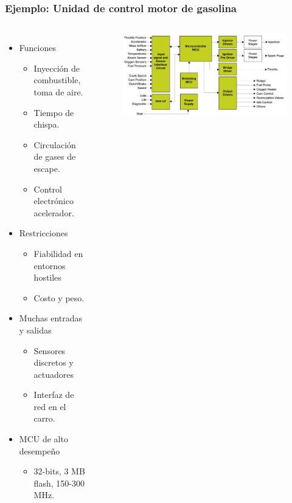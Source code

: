 \documentclass[10.5pt,scale=1.0,t,aspectratio=169,hyperref={pdfpagelabels=false}]{beamer}
\begin{document}
\begin{frame}
	\frametitle{Ejemplo: Unidad de control motor de gasolina}
	\begin{columns}
		\begin{itemize}
			\item \textcolor{BlueLight}{Funciones}
			\begin{itemize}
				\item Inyección de combustible, toma de aire.
				\item Tiempo de chispa.
				\item Circulación de gases de escape. 
				\item Control electrónico acelerador.
			\end{itemize}
			\item \textcolor{BlueLight}{Restricciones}
			\begin{itemize}
				\item Fiabilidad en entornos hostiles
				\item Costo y peso.
			\end{itemize}
			\item \textcolor{BlueLight}{Muchas entradas y salidas}
			\begin{itemize}
				\item Sensores discretos y actuadores
				\item Interfaz de red en el carro.
			\end{itemize}
			\item \textcolor{BlueLight}{MCU de alto desempeño}
			\begin{itemize}
				\item 32-bits, 3 MB flash, 150-300 MHz.
			\end{itemize}
		\end{itemize}
		
		\begin{figure}
			\centering
			\includegraphics[scale=0.45]{ControlUnitEngine}
		\end{figure}		
	\end{columns}
\end{frame}
\end{document}
